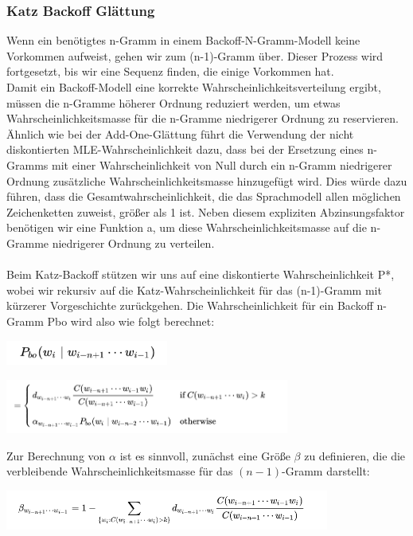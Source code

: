 \documentclass[12pt]{article}
\begin{document}
\subsubsection{Katz Backoff Glättung}
\quad Wenn ein benötigtes n-Gramm in einem Backoff-N-Gramm-Modell keine Vorkommen aufweist, gehen wir zum (n-1)-Gramm über. Dieser Prozess wird fortgesetzt, bis wir eine Sequenz finden, die einige Vorkommen hat.
\\ Damit ein Backoff-Modell eine korrekte Wahrscheinlichkeitsverteilung ergibt, müssen die n-Gramme höherer Ordnung reduziert werden, um etwas Wahrscheinlichkeitsmasse für die n-Gramme niedrigerer Ordnung zu reservieren. Ähnlich wie bei der Add-One-Glättung führt die Verwendung der nicht diskontierten MLE-Wahrscheinlichkeit dazu, dass bei der Ersetzung eines n-Gramms mit einer Wahrscheinlichkeit von Null durch ein n-Gramm niedrigerer Ordnung zusätzliche Wahrscheinlichkeitsmasse hinzugefügt wird. Dies würde dazu führen, dass die Gesamtwahrscheinlichkeit, die das Sprachmodell allen möglichen Zeichenketten zuweist, größer als 1 ist. Neben diesem expliziten Abzinsungsfaktor benötigen wir eine Funktion a, um diese Wahrscheinlichkeitsmasse auf die n-Gramme niedrigerer Ordnung zu verteilen.
\\ \\Beim Katz-Backoff stützen wir uns auf eine diskontierte Wahrscheinlichkeit P*, wobei wir rekursiv auf die Katz-Wahrscheinlichkeit für das (n-1)-Gramm mit kürzerer Vorgeschichte zurückgehen. Die Wahrscheinlichkeit für ein Backoff n-Gramm Pbo wird also wie folgt berechnet:
\begin{center}
	\includegraphics[width=0.4\textwidth]{statics/Borisov/8.PNG}
\end{center}
\begin{center}
	\includegraphics[width=0.7\textwidth]{statics/Borisov/9.PNG}
\end{center}

\quad Zur Berechnung von $\alpha$ ist es sinnvoll, zunächst eine Größe $\beta$ zu definieren, die die verbleibende Wahrscheinlichkeitsmasse für das $(n - 1)$-Gramm darstellt:


\begin{center}
	\includegraphics[width=0.8\textwidth]{statics/Borisov/10.PNG}
\end{center}
\end{document}

